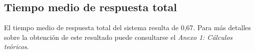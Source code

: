 \subsection{Tiempo medio de respuesta total}
El tiempo medio de respuesta total del sistema resulta de 0,67. Para más detalles sobre la obtención de este resultado puede consultarse el \textit{Anexo 1: Cálculos teóricos}.\\